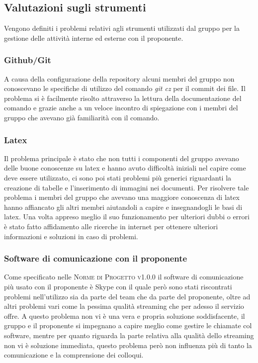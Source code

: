 \documentclass[../piano-di-qualifica.tex]{subfiles}
\begin{document}
\subsection{Valutazioni sugli strumenti}
\label{sub:valutazioni_strumenti}
Vengono definiti i problemi relativi agli strumenti utilizzati dal gruppo per la gestione delle attività interne ed esterne con il proponente.

\subsubsection{Github/Git}
\label{sub:github}
A causa della configurazione della repository alcuni membri del gruppo non conoscevano le specifiche di utilizzo del comando \textit{git cz} per il commit dei file. Il problema si è facilmente risolto attraverso la lettura della documentazione del comando e grazie anche a un veloce incontro di spiegazione con i membri del gruppo che avevano già familiarità con il comando.

\subsubsection{Latex}
\label{sub:latex}
Il problema principale è stato che non tutti i componenti del gruppo avevano delle buone conoscenze su latex e hanno avuto difficoltà iniziali nel capire come deve essere utilizzato, ci sono poi stati problemi più generici riguardanti la creazione di tabelle e l'inserimento di immagini nei documenti.
Per risolvere tale problema i membri del gruppo che avevano una maggiore conoscenza di latex hanno affiancato gli altri membri aiutandoli a capire e insegnandogli le basi di latex. Una volta appreso meglio il suo funzionamento per ulteriori dubbi o errori è stato fatto affidamento alle ricerche in internet per ottenere ulteriori informazioni e soluzioni in caso di problemi.

\subsubsection{Software di comunicazione con il proponente}
\label{sub:latex}
Come specificato nelle \textsc{Norme di Progetto v1.0.0} il software di comunicazione più usato con il proponente è Skype con il quale però sono stati riscontrati problemi nell'utilizzo sia da parte del team che da parte del proponente, oltre ad altri problemi vari come la pessima qualità streaming che per adesso il servizio offre.
A questo problema non vi è una vera e propria soluzione soddisfacente, il gruppo e il proponente si impegnano a capire meglio come gestire le chiamate col software, mentre per quanto riguarda la parte relativa alla qualità dello streaming non vi è soluzione immediata, questo problema però non influenza più di tanto la comunicazione e la comprensione dei colloqui.
\end{document}

